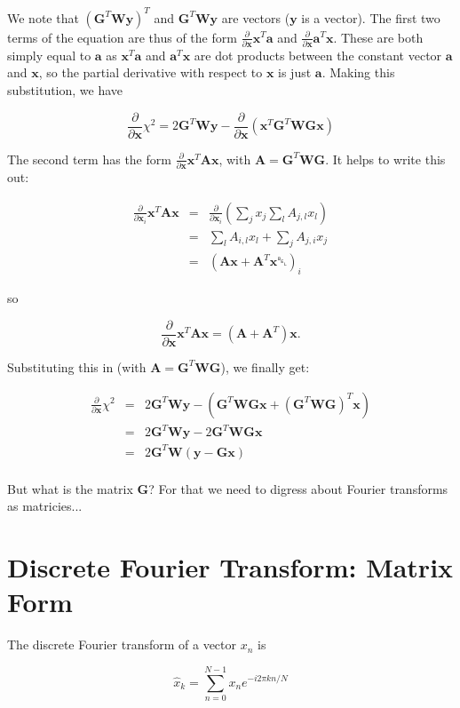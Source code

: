 \documentclass[12pt]{article}
\newcommand{\G}{\mathbf{G}}
\newcommand{\x}{\mathbf{x}}
\newcommand{\y}{\mathbf{y}}
\newcommand{\W}{\mathbf{W}}
\newcommand{\A}{\mathbf{A}}
\newcommand{\avec}{\mathbf{a}}
\newcommand{\ddx}{\frac{\partial}{\partial \mathbf{x}}}
\newcommand{\ddxi}{\frac{\partial}{\partial \mathbf{x}_{i}}}
\begin{document}
We note that $(\G^{T} \W \y)^{T}$ and $\G^{T} \W \y$ are vectors ($\y$ is a
vector). The first two terms of the equation are thus of the form
$\ddx \x^T \avec$ and $\ddx \avec^T \x$. These are both simply equal to
$\avec$ as $\x^T \avec$ and $\avec^T \x$ are dot products between the
constant vector $\avec$ and $\x$, so the partial derivative with respect to
$\x$ is just $\avec$. Making this substitution, we have

\begin{equation}
\ddx \chi^{2} = 2 \G^T \W \y - \ddx \left( \x^{T} \G^{T} \W \G \x \right)
\end{equation}

\noindent The second term has the form $\ddx \x^T\A\x$, with
$\A = \G^T \W \G$. It helps to write this out:

\begin{eqnarray*}
  \ddxi \x^{T}\A\x & = & \ddxi \left( \sum_{j} x_{j} \sum_l A_{j,l} x_{l}  \right) \\
                   & = & \sum_l A_{i,l} x_{l} + \sum_j A_{j,i} x_{j} \\
                   & = & \left( \A \x + \A^{T} \x␇ \right)_{i}
\end{eqnarray*}

so

\begin{equation}
  \ddx \x^T\A\x = (\A + \A^T) \x .
\end{equation}

Substituting this in (with $\A = \G^T \W \G$), we finally get:

\begin{eqnarray*}
\ddx \chi^{2} & = & 2 \G^T \W \y - \left( \G^T \W \G \x + (\G^T \W \G)^T \x \right) \\
              & = & 2 \G^T \W \y - 2 \G^T \W \G \x \\
              & = & 2 \G^T \W ( \y - \G \x ) \\
\end{eqnarray*}

But what is the matrix $\G$? For that we need to digress about Fourier transforms
as matricies...

\section{Discrete Fourier Transform: Matrix Form}

The discrete Fourier transform of a vector $x_n$ is

\begin{equation}
\hat{x}_k = \sum_{n=0}^{N-1} x_n e^{-i 2 \pi k n / N}
\end{equation}
\end{document}
